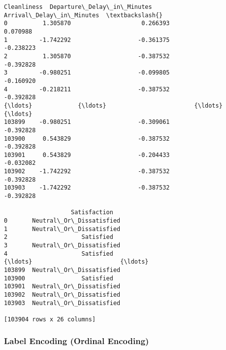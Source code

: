 \documentclass[11pt]{article}
\begin{document}
\begin{tcolorbox}[breakable, size=fbox, boxrule=.5pt, pad at break*=1mm, opacityfill=0]
\begin{Verbatim}[commandchars=\\\{\}]
        Cleanliness  Departure\_Delay\_in\_Minutes  Arrival\_Delay\_in\_Minutes  \textbackslash{}
0          1.305870                    0.266393                  0.070988
1         -1.742292                   -0.361375                 -0.238223
2          1.305870                   -0.387532                 -0.392828
3         -0.980251                   -0.099805                 -0.160920
4         -0.218211                   -0.387532                 -0.392828
{\ldots}             {\ldots}                         {\ldots}                       {\ldots}
103899    -0.980251                   -0.309061                 -0.392828
103900     0.543829                   -0.387532                 -0.392828
103901     0.543829                   -0.204433                 -0.032082
103902    -1.742292                   -0.387532                 -0.392828
103903    -1.742292                   -0.387532                 -0.392828

                   Satisfaction
0       Neutral\_Or\_Dissatisfied
1       Neutral\_Or\_Dissatisfied
2                     Satisfied
3       Neutral\_Or\_Dissatisfied
4                     Satisfied
{\ldots}                         {\ldots}
103899  Neutral\_Or\_Dissatisfied
103900                Satisfied
103901  Neutral\_Or\_Dissatisfied
103902  Neutral\_Or\_Dissatisfied
103903  Neutral\_Or\_Dissatisfied

[103904 rows x 26 columns]
\end{Verbatim}
\end{tcolorbox}
        
    \subsubsection{Label Encoding (Ordinal
Encoding)}\label{label-encoding-ordinal-encoding}
\end{document}
